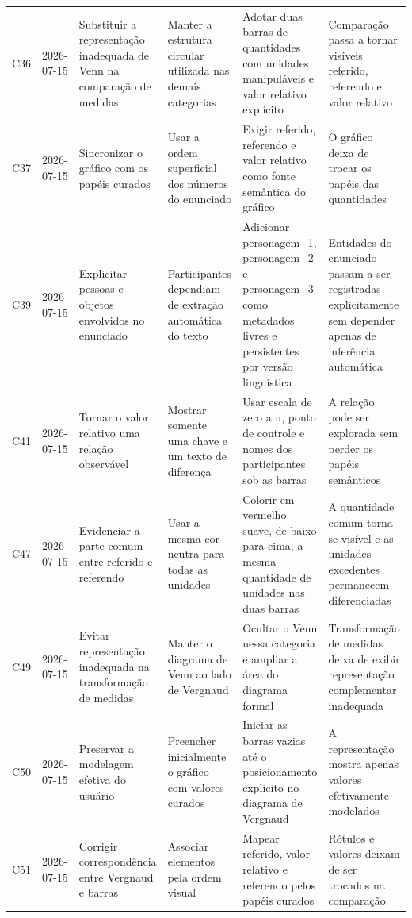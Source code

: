\begin{landscape}
\begin{longtable}{p{1.0cm}p{1.9cm}p{4.0cm}p{5.0cm}p{6.2cm}p{5.7cm}}
\addlinespace[2pt]
C36 & 2026-07-15 & Substituir a representação inadequada de Venn na comparação de medidas & Manter a estrutura circular utilizada nas demais categorias & Adotar duas barras de quantidades com unidades manipuláveis e valor relativo explícito & Comparação passa a tornar visíveis referido, referendo e valor relativo \\
\addlinespace[2pt]
C37 & 2026-07-15 & Sincronizar o gráfico com os papéis curados & Usar a ordem superficial dos números do enunciado & Exigir referido, referendo e valor relativo como fonte semântica do gráfico & O gráfico deixa de trocar os papéis das quantidades \\
\addlinespace[2pt]
C39 & 2026-07-15 & Explicitar pessoas e objetos envolvidos no enunciado & Participantes dependiam de extração automática do texto & Adicionar personagem\_1, personagem\_2 e personagem\_3 como metadados livres e persistentes por versão linguística & Entidades do enunciado passam a ser registradas explicitamente sem depender apenas de inferência automática \\
\addlinespace[2pt]
C41 & 2026-07-15 & Tornar o valor relativo uma relação observável & Mostrar somente uma chave e um texto de diferença & Usar escala de zero a n, ponto de controle e nomes dos participantes sob as barras & A relação pode ser explorada sem perder os papéis semânticos \\
\addlinespace[2pt]
C47 & 2026-07-15 & Evidenciar a parte comum entre referido e referendo & Usar a mesma cor neutra para todas as unidades & Colorir em vermelho suave, de baixo para cima, a mesma quantidade de unidades nas duas barras & A quantidade comum torna-se visível e as unidades excedentes permanecem diferenciadas \\
\addlinespace[2pt]
C49 & 2026-07-15 & Evitar representação inadequada na transformação de medidas & Manter o diagrama de Venn ao lado de Vergnaud & Ocultar o Venn nessa categoria e ampliar a área do diagrama formal & Transformação de medidas deixa de exibir representação complementar inadequada \\
\addlinespace[2pt]
C50 & 2026-07-15 & Preservar a modelagem efetiva do usuário & Preencher inicialmente o gráfico com valores curados & Iniciar as barras vazias até o posicionamento explícito no diagrama de Vergnaud & A representação mostra apenas valores efetivamente modelados \\
\addlinespace[2pt]
C51 & 2026-07-15 & Corrigir correspondência entre Vergnaud e barras & Associar elementos pela ordem visual & Mapear referido, valor relativo e referendo pelos papéis curados & Rótulos e valores deixam de ser trocados na comparação \\

\end{longtable}
\end{landscape}
